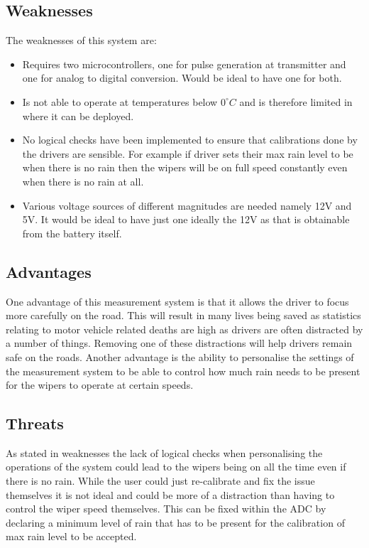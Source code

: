 \documentclass[conference, 11pt]{IEEEtran}
\begin{document}
\subsection{Weaknesses}
The weaknesses of this system are:
\begin{itemize}
\item Requires two microcontrollers, one for pulse generation at transmitter and one for analog to digital conversion. Would be ideal to have one for both. 
\item Is not able to operate at temperatures below $0^{\circ}C$ and is therefore limited in where it can be deployed. 
\item No logical checks have been implemented to ensure that calibrations done by the drivers are sensible. For example if driver sets their max rain level to be when there is no rain then the wipers will be on full speed constantly even when there is no rain at all. 
\item Various voltage sources of different magnitudes are needed namely 12V and 5V. It would be ideal to have just one ideally the 12V as that is obtainable from the battery itself. 
\end{itemize}

\subsection{Advantages}
One advantage of this measurement system is that it allows the driver to focus more carefully on the road. This will result in many lives being saved as statistics relating to motor vehicle related deaths are high as drivers are often distracted by a number of things. Removing one of these distractions will help drivers remain safe on the roads. Another advantage is the ability to personalise the settings of the measurement system to be able to control how much rain needs to be present for the wipers to operate at certain speeds.

\subsection{Threats}
As stated in weaknesses the lack of logical checks when personalising the operations of the system could lead to the wipers being on all the time even if there is no rain. While the user could just re-calibrate and fix the issue themselves it is not ideal and could be more of a distraction than having to control the wiper speed themselves. This can be fixed within the ADC by declaring a minimum level of rain that has to be present for the calibration of max rain level to be accepted.
\end{document}
